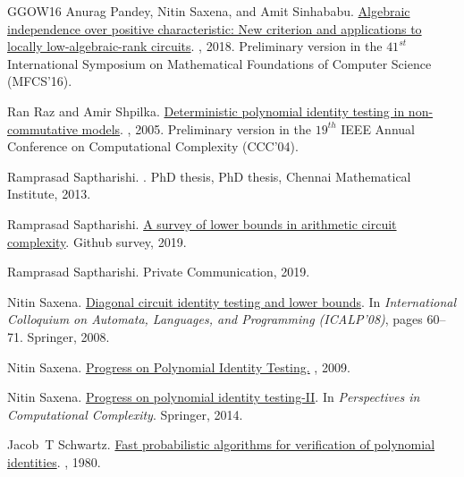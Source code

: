 \documentclass[10pt,a4paper]{article}
\numberwithin{equation}{section}
\begin{document}
\begin{thebibliography}{GGOW16}
Anurag Pandey, Nitin Saxena, and Amit Sinhababu.
\newblock
  \href{https://link.springer.com/article/10.1007/s00037-018-0167-5}{Algebraic
  independence over positive characteristic: New criterion and applications to
  locally low-algebraic-rank circuits}.
, 2018.
\newblock Preliminary version in the $41^{st}$ International Symposium on
  Mathematical Foundations of Computer Science (MFCS'16).

Ran Raz and Amir Shpilka.
\newblock
  \href{https://link.springer.com/article/10.1007/s00037-005-0188-8}{Deterministic
  polynomial identity testing in non-commutative models}.
, 2005.
\newblock Preliminary version in the $19^{th}$ IEEE Annual Conference on
  Computational Complexity (CCC'04).

Ramprasad Saptharishi.
.
\newblock PhD thesis, PhD thesis, Chennai Mathematical Institute, 2013.

Ramprasad Saptharishi.
\newblock \href{https://github. com/dasarpmar/lowerbounds-survey/releases}{A
  survey of lower bounds in arithmetic circuit complexity}.
\newblock Github survey, 2019.

Ramprasad Saptharishi.
\newblock Private Communication, 2019.

Nitin Saxena.
\newblock
  \href{https://link.springer.com/chapter/10.1007/978-3-540-70575-8_6}{Diagonal
  circuit identity testing and lower bounds}.
\newblock In {\em International Colloquium on Automata, Languages, and
  Programming (ICALP'08)}, pages 60--71. Springer, 2008.

Nitin Saxena.
\newblock
  \href{https://www.cse.iitk.ac.in/users/nitin/papers/pit-survey09.pdf}{Progress
  on Polynomial Identity Testing.}
, 2009.

Nitin Saxena.
\newblock
  \href{https://link.springer.com/chapter/10.1007/978-3-319-05446-9_7}{Progress
  on polynomial identity testing-II}.
\newblock In {\em Perspectives in Computational Complexity}. Springer, 2014.

Jacob~T Schwartz.
\newblock \href{https://dl.acm.org/doi/10.1145/322217.322225}{Fast
  probabilistic algorithms for verification of polynomial identities}.
, 1980.


\end{thebibliography}
\end{document}
